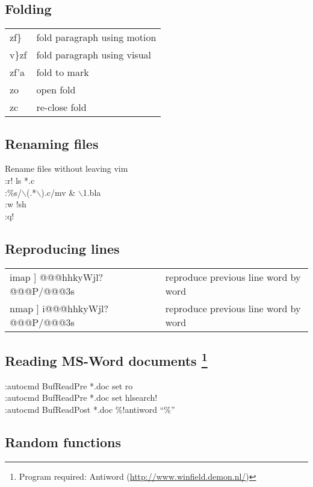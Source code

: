 \documentclass[10pt]{article}
\begin{document}
\subsection*{Folding}
\begin{center}
\begin{longtable}{l|l}
 zf\} & fold paragraph using motion\\
 v\}zf & fold paragraph using visual\\
 zf'a & fold to mark\\
 zo & open fold\\
 zc & re-close fold
\end{longtable}
\end{center}

\subsection*{Renaming files}
 Rename files without leaving vim\\
 :r! ls *.c\\
 :\%s/$\backslash$(.*$\backslash$).c/mv \& $\backslash$1.bla\\
 :w !sh\\
 :q!

\subsection*{Reproducing lines}
\begin{center}
\begin{longtable}{l|l}
 imap ] @@@hhkyWjl?@@@P/@@@3s & reproduce previous line word by word\\
 nmap ] i@@@hhkyWjl?@@@P/@@@3s & reproduce previous line word by word
\end{longtable}
\end{center}

\subsection*{Reading MS-Word documents \footnote{Program required: Antiword (\url{http://www.winfield.demon.nl/})}}
 :autocmd BufReadPre *.doc set ro\\
 :autocmd BufReadPre *.doc set hlsearch!\\
 :autocmd BufReadPost *.doc \%!antiword ``\%''

\subsection*{Random functions}
\end{document}
